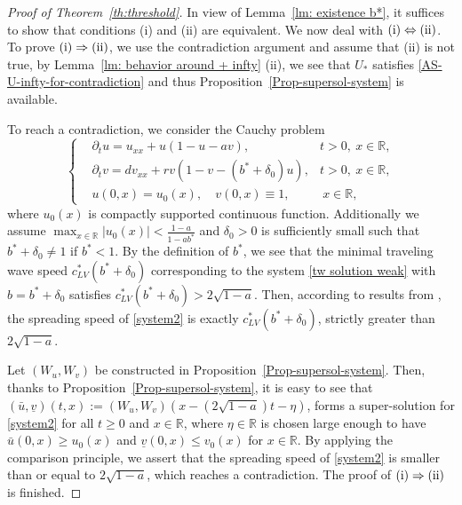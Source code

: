 \documentclass[11pt,a4paper]{article}
\numberwithin{equation}{section}
\numberwithin{figure}{section}
\newcommand{\red}[1]{{\color{red}#1}}
\begin{document}
\begin{proof}[Proof of Theorem~\ref{th:threshold}]
In view of Lemma~\ref{lm: existence b*}, it suffices to show that conditions (i) and (ii) are equivalent.
We now deal with ${\rm(i)}\Leftrightarrow {\rm(ii)}$. To prove ${\rm(i)}\Rightarrow{\rm(ii)}$, we use the contradiction argument and assume that (ii) is not true, by Lemma~\ref{lm: behavior around + infty} (ii), we see that $U_*$ satisfies \eqref{AS-U-infty-for-contradiction} and thus Proposition~\ref{Prop-supersol-system} is available.

To reach a contradiction, we consider the Cauchy problem
\begin{equation}\label{system2}
\left\{
\begin{aligned}
&\partial_tu=u_{xx}+u(1-u-av), & t>0,\ x\in\mathbb{R},\\
&\partial_tv=dv_{xx}+rv(1-v-(b^*+\delta_0)u), & t>0,\ x\in \mathbb{R},\\
&u(0,x)=u_0(x),\quad  v(0,x)\equiv1, & \ x\in \mathbb{R},
\end{aligned}
\right.
\end{equation}
where $u_0(x)$ %
is compactly supported continuous function. Additionally we assume $\max_{x\in\mathbb{R}} |u_0(x)|<\frac{1-a}{1-ab^*}$ and $\delta_0>0$ is sufficiently small such that
$b^*+\delta_0\neq 1$ if $b^*<1$.
By the definition of $b^*$, we see that the minimal traveling wave speed $c^{*}_{LV}(b^*+\delta_0)$ corresponding to the system \eqref{tw solution weak} with $b=b^*+\delta_0$ satisfies $c^{*}_{LV}(b^*+\delta_0)>2\sqrt{1-a}$.
Then, according to results from \cite{Lewis Li Weinberger 1, Lewis Li Weinberger 2},
the spreading speed of \eqref{system2} is
exactly $c^{*}_{LV}(b^*+\delta_0)$, strictly greater than $2\sqrt{1-a}$.

Let $(W_u, W_v)$ be constructed in Proposition~\ref{Prop-supersol-system}. Then, thanks to Proposition~\ref{Prop-supersol-system}, it is easy to see that
$(\bar{u},\underline{v})(t,x):=(W_u,W_v)(x-(2\sqrt{1-a})t-\eta)$, forms a super-solution for \eqref{system2} for all $t\ge 0$ and $x\in\mathbb{R}$, where $\eta\in\mathbb{R}$ is chosen large enough to have $\bar{u}(0,x)\geq u_0(x)$ and $\underline{v}(0,x)\leq v_0(x)$ for $x\in\mathbb{R}$.
By applying the comparison principle, we assert that the spreading speed of \eqref{system2} is smaller than or equal to $2\sqrt{1-a}$,
which reaches a contradiction.
The proof of ${\rm(i)}\Rightarrow {\rm(ii)}$ is finished.


\end{proof}
\end{document}
